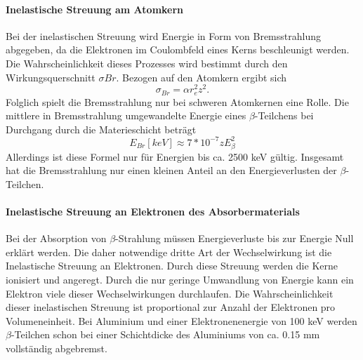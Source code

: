 \documentclass[11pt,ngerman,a4paper]{article}
\begin{document}
\paragraph{Inelastische Streuung am Atomkern}
Bei der inelastischen Streuung wird Energie in Form von Bremsstrahlung abgegeben, da die Elektronen im Coulombfeld eines Kerns beschleunigt werden. Die Wahrscheinlichkeit dieses Prozesses wird bestimmt durch den Wirkungsquerschnitt $\sigma{Br}$. Bezogen auf den Atomkern ergibt sich
\begin{equation}
\sigma_{Br} = \alpha r_e^2 z^2.
\label{8}
\end{equation}
Folglich spielt die Bremsstrahlung nur bei schweren Atomkernen eine Rolle. Die mittlere in Bremsstrahlung umgewandelte Energie eines $\beta$-Teilchens bei Durchgang durch die Materieschicht beträgt
\begin{equation}
E_{Br}[keV] \approx 7*10^{-7}zE_{\beta}^2
\label{9}
\end{equation}
Allerdings ist diese Formel nur für Energien bis ca. 2500 keV gültig. Insgesamt hat die Bremsstrahlung nur einen kleinen Anteil an den Energieverlusten der $\beta$-Teilchen.
\paragraph{Inelastische Streuung an Elektronen des Absorbermaterials}
Bei der Absorption von $\beta$-Strahlung müssen Energieverluste bis zur Energie Null erklärt werden. Die daher notwendige dritte Art der Wechselwirkung ist die Inelastische Streuung an Elektronen. Durch diese Streuung werden die Kerne ionisiert und angeregt. Durch die nur geringe Umwandlung von Energie kann ein Elektron viele dieser Wechselwirkungen durchlaufen. Die Wahrscheinlichkeit dieser inelastischen Streuung ist proportional zur Anzahl der Elektronen pro Volumeneinheit. Bei Aluminium und einer Elektronenenergie von 100 keV werden $\beta$-Teilchen schon bei einer Schichtdicke des Aluminiums von ca. 0.15 mm vollständig abgebremst.
\end{document}
